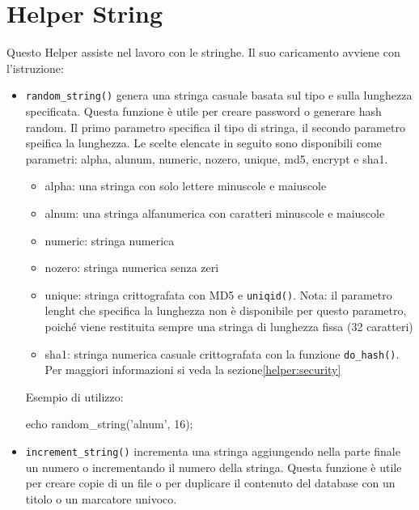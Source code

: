 \section{Helper String}
\label{helper:string}

Questo Helper assiste nel lavoro con le stringhe. Il suo caricamento avviene con l'istruzione:


\begin{itemize}
\item \verb|random_string()| genera una stringa casuale basata sul tipo e sulla lunghezza specificata. Questa funzione è utile per creare password o generare hash random. Il primo parametro specifica il tipo di stringa, il secondo parametro speifica la lunghezza. Le scelte elencate in seguito sono disponibili come parametri: alpha, alunum, numeric, nozero, unique, md5, encrypt e sha1.

\begin{itemize}
\item alpha: una stringa con solo lettere minuscole e maiuscole
\item alnum: una stringa alfanumerica con caratteri minuscole e maiuscole
\item numeric: stringa numerica
\item nozero: stringa numerica senza zeri
\item unique: stringa crittografata con MD5 e \verb|uniqid()|. Nota: il parametro lenght che specifica la lunghezza non è disponibile per questo parametro, poiché viene restituita sempre una stringa di lunghezza fissa (32 caratteri)
\item sha1: stringa numerica casuale crittografata con la funzione \verb|do_hash()|. Per maggiori informazioni si veda la sezione\vref{helper:security}
\end{itemize}

Esempio di utilizzo:

\begin{code}
echo random_string('alnum', 16);
\end{code}

\item \verb|increment_string()| incrementa una stringa aggiungendo nella parte finale un numero  o incrementando il numero della stringa. Questa funzione è utile per creare copie di un file o per duplicare il contenuto del database con un titolo o un marcatore univoco.


\end{itemize}
